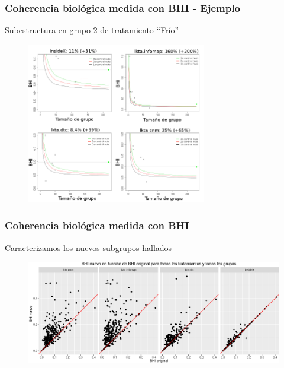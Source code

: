 \documentclass[serif,9pt, t]{beamer}
\begin{document}
\begin{frame}\frametitle{Coherencia biológica medida con BHI - Ejemplo} 
\centering
Subestructura en grupo 2 de tratamiento ``Frío''\\
\begin{figure}
\centering
\includegraphics[width=0.7\textwidth]{metodos_mixtos_grupo_2_chico.png}
\end{figure}
\end{frame}

\begin{frame}\frametitle{Coherencia biológica medida con BHI} 
\centering
Caracterizamos los nuevos subgrupos hallados\\
\vspace{20pt}
\begin{figure}
\centering
\includegraphics[width=1\textwidth]{bhi_nuevo_vs_bhi_original.pdf}
\end{figure}
\end{frame}
\end{document}
